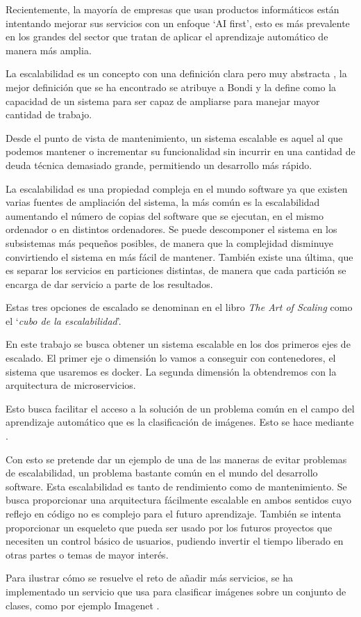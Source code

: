 Recientemente, la mayoría de empresas que usan productos informáticos están intentando mejorar sus servicios con un enfoque `AI first', esto es más prevalente en los grandes del sector que  tratan de aplicar el aprendizaje automático de manera más amplia.

La escalabilidad es un concepto con una definición clara pero muy abstracta \cite{hill90}, la mejor definición que se ha encontrado se atribuye a Bondi \cite{bondi00} y la define como la capacidad de un sistema para ser capaz de ampliarse para manejar mayor cantidad de trabajo. 

Desde el punto de vista de mantenimiento, un sistema escalable es aquel al que podemos mantener o incrementar su funcionalidad sin incurrir en una cantidad de deuda técnica demasiado grande, permitiendo un desarrollo más rápido.

La escalabilidad es una propiedad compleja en el mundo software ya que existen varias fuentes de ampliación del sistema, la más común es la escalabilidad aumentando el número de copias del software que se ejecutan, en el mismo ordenador o en distintos ordenadores. Se puede descomponer el sistema en los subsistemas más pequeños posibles, de manera que la complejidad disminuye convirtiendo el sistema en más fácil de mantener. También existe una última, que es separar los servicios en particiones distintas, de manera que cada partición se encarga de dar servicio a parte de los resultados.

Estas tres opciones de escalado se denominan en el libro \emph{The Art of Scaling} \cite{scala09} como el `\emph{cubo de la escalabilidad}'. 

En este trabajo se busca obtener un sistema escalable en los dos primeros ejes de escalado. El primer eje o dimensión lo vamos a conseguir con contenedores, el sistema que usaremos es docker. La segunda dimensión la obtendremos con la arquitectura de microservicios. 

Esto busca facilitar el acceso a la solución de un problema común en el campo del aprendizaje automático que es la clasificación de imágenes. Esto se hace mediante .

Con esto se pretende dar un ejemplo de una de las  maneras de evitar problemas de escalabilidad, un problema bastante común en el mundo del desarrollo software. Esta escalabilidad es tanto de rendimiento como de mantenimiento. Se busca proporcionar una arquitectura fácilmente escalable en ambos sentidos cuyo reflejo en código no es complejo para el futuro aprendizaje. También se intenta proporcionar un esqueleto que pueda ser usado por los futuros proyectos que necesiten un control básico de usuarios, pudiendo invertir el tiempo liberado en otras partes o temas de mayor interés.

Para ilustrar cómo se resuelve el reto de añadir más servicios, se ha implementado un servicio que usa  para clasificar imágenes sobre un conjunto de clases, como por ejemplo Imagenet \cite{imnet}.